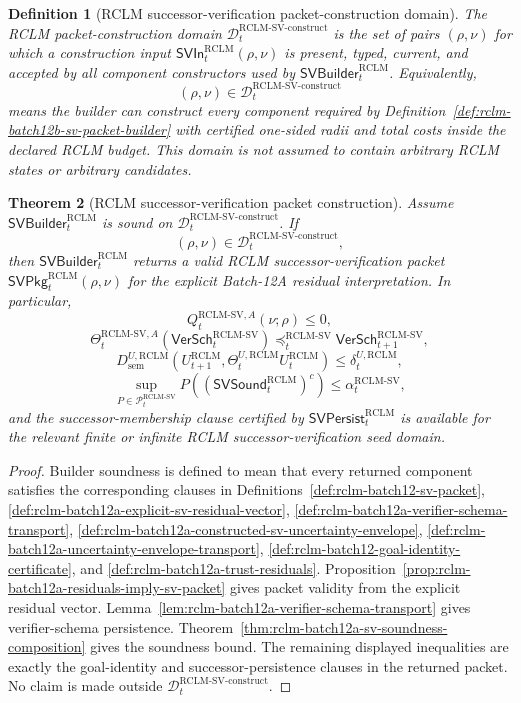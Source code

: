 \documentclass[11pt,a4paper]{article}
\newtheorem{theorem}{Theorem}[section]
\newtheorem{definition}[theorem]{Definition}
\newcommand{\Pcal}{\mathcal P}
\newcommand{\Dcal}{\mathcal D}
\newcommand{\RCLM}{\mathrm{RCLM}}
\newcommand{\sem}{\mathrm{sem}}
\begin{document}
\begin{definition}[RCLM successor-verification packet-construction domain]
\label{def:rclm-batch12b-sv-packet-construction-domain}
The RCLM packet-construction domain \(\Dcal_t^{\RCLM\text{-}\mathrm{SV\mbox{-}construct}}\) is the set of pairs \((\rho,\nu)\) for which a construction input \(\mathsf{SVIn}_t^{\RCLM}(\rho,\nu)\) is present, typed, current, and accepted by all component constructors used by \(\mathsf{SVBuilder}_t^{\RCLM}\). Equivalently,
\[
(\rho,\nu)\in\Dcal_t^{\RCLM\text{-}\mathrm{SV\mbox{-}construct}}
\]
means the builder can construct every component required by Definition~\ref{def:rclm-batch12b-sv-packet-builder} with certified one-sided radii and total costs inside the declared RCLM budget. This domain is not assumed to contain arbitrary RCLM states or arbitrary candidates.
\end{definition}

\begin{theorem}[RCLM successor-verification packet construction]
\label{thm:rclm-batch12b-sv-packet-construction}
Assume \(\mathsf{SVBuilder}_t^{\RCLM}\) is sound on \(\Dcal_t^{\RCLM\text{-}\mathrm{SV\mbox{-}construct}}\). If
\[
(\rho,\nu)\in\Dcal_t^{\RCLM\text{-}\mathrm{SV\mbox{-}construct}},
\]
then \(\mathsf{SVBuilder}_t^{\RCLM}\) returns a valid RCLM successor-verification packet \(\mathsf{SVPkg}_t^{\RCLM}(\rho,\nu)\) for the explicit Batch-12A residual interpretation. In particular,
\[
Q_t^{\RCLM\text{-}\mathrm{SV},A}(\nu;\rho)\le0,
\]
\[
\Theta_t^{\RCLM\text{-}\mathrm{SV},A}(\mathsf{VerSch}_t^{\RCLM\text{-}\mathrm{SV}})
\preceq_t^{\RCLM\text{-}\mathrm{SV}}
\mathsf{VerSch}_{t+1}^{\RCLM\text{-}\mathrm{SV}},
\]
\[
D_{\sem}^{U,\RCLM}(U_{t+1}^{\RCLM},\Theta_t^{U,\RCLM}U_t^{\RCLM})
\le
\delta_t^{U,\RCLM},
\]
\[
\sup_{P\in\Pcal_t^{\RCLM\text{-}\mathrm{SV}}}
P((\mathsf{SVSound}_t^{\RCLM})^c)
\le
\alpha_t^{\RCLM\text{-}\mathrm{SV}},
\]
and the successor-membership clause certified by \(\mathsf{SVPersist}_t^{\RCLM}\) is available for the relevant finite or infinite RCLM successor-verification seed domain.
\end{theorem}

\begin{proof}
Builder soundness is defined to mean that every returned component satisfies the corresponding clauses in Definitions~\ref{def:rclm-batch12-sv-packet}, \ref{def:rclm-batch12a-explicit-sv-residual-vector}, \ref{def:rclm-batch12a-verifier-schema-transport}, \ref{def:rclm-batch12a-constructed-sv-uncertainty-envelope}, \ref{def:rclm-batch12a-uncertainty-envelope-transport}, \ref{def:rclm-batch12-goal-identity-certificate}, and \ref{def:rclm-batch12a-trust-residuals}. Proposition~\ref{prop:rclm-batch12a-residuals-imply-sv-packet} gives packet validity from the explicit residual vector. Lemma~\ref{lem:rclm-batch12a-verifier-schema-transport} gives verifier-schema persistence. Theorem~\ref{thm:rclm-batch12a-sv-soundness-composition} gives the soundness bound. The remaining displayed inequalities are exactly the goal-identity and successor-persistence clauses in the returned packet. No claim is made outside \(\Dcal_t^{\RCLM\text{-}\mathrm{SV\mbox{-}construct}}\).
\end{proof}
\end{document}
